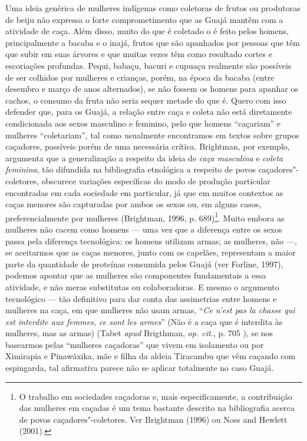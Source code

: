 Uma ideia genérica de mulheres indígenas como coletoras de frutos ou
produtoras de beiju não expressa o forte comprometimento que as Guajá
mantêm com a atividade de caça. Além disso, muito do que é coletado o é
feito pelos homens, principalmente a bacaba e o inajá, frutos que são
apanhados por pessoas que têm que subir em suas árvores e que muitas
vezes têm como resultado cortes e escoriações profundas. Pequi, babaçu,
bacuri e cupuaçu realmente são possíveis de ser colhidos por mulheres e
crianças, porém, na época da bacaba (entre desembro e março de anos
alternados), se não fossem os homens para apanhar os cachos, o consumo
da fruta não seria sequer metade do que é. Quero com isso defender que,
para os Guajá, a relação entre caça e coleta não está diretamente
condicionada aos sexos masculino e feminino, pelo que homens ``caçariam''
e mulheres ``coletariam'', tal como usualmente encontramos em textos sobre
grupos caçadores, passíveis porém de uma necessária crítica. Brightman,
por exemplo, argumenta que a generalização a respeito da ideia de
\emph{caça masculina} e \emph{coleta feminina}, tão difundida na
bibliografia etnológica a respeito de povos caçadores"-coletores,
obscurece variações específicas do modo de produção particular
encontradas em cada sociedade em particular, já que em muitos contextos
as caças menores são capturadas por ambos os sexos ou, em alguns casos,
preferencialmente por mulheres (Brightman, 1996, p. 689)\footnote{O
  trabalho em sociedades caçadoras e, mais especificamente, a
  contribuição das mulheres em caçadas é um tema bastante descrito na
  bibliografia acerca de povos caçadores"-coletores. Ver Brightman (1996)
  ou Noss and Hewlett (2001).}. Muito embora as mulheres não cacem como
homens --- uma vez que a diferença entre os sexos passa pela diferença
tecnológica: os homens utilizam armas; as mulheres, não ---, se aceitarmos
que as caças menores, junto com os capelães, representam a maior parte
da quantidade de proteínas consumida pelos Guajá (ver Forline, 1997),
podemos apontar que as mulheres são componentes fundamentais a essa
atividade, e não meras substitutas ou colaboradoras. E mesmo o argumento
tecnológico --- tão definitivo para dar conta das assimetrias entre homens
e mulheres na caça, em que mulheres não usam armas, ``\emph{Ce n'est pas
la chasse qui est interdite aux femmes, ce sont les armes}'' (Não é a
caça que é interdita às mulheres, mas as armas) (Tabet \emph{apud} Brigthman,
\emph{op. cit.}, p. 705 ), se nos basearmos pelas ``mulheres caçadoras'' que
vivem em isolamento ou por Ximirapia e Pinawãxika, mãe e filha da aldeia
Tiracambu que vêm caçando com espingarda, tal afirmativa parece não se
aplicar totalmente no caso Guajá.

